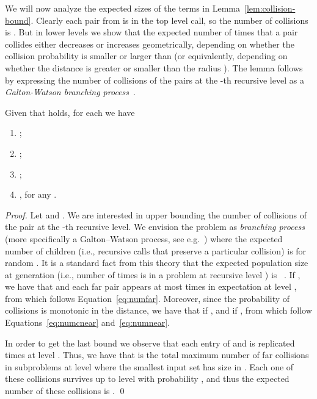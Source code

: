 \documentclass{llncs}
\begin{document}
We will now analyze the expected sizes of the terms in Lemma~\ref{lem:collision-bound}. 
Clearly each pair from  is in the top level call, so the number of collisions is . 
But in lower levels we show that the expected number of times that a pair collides either decreases or increases geometrically, depending on whether the collision probability is smaller or larger than  (or equivalently, depending on whether the distance is greater or smaller than the radius ). 
The lemma follows by expressing the number of collisions of the pairs at the -th recursive level as a \emph{Galton-Watson branching process}~\cite{harris2002theory}. 


\begin{lemma}\label{lemma:expectation}
Given that  holds, for each  we have

\begin{enumerate}
	\item \label{eq:numfar};
	\item  \label{eq:numcnear};
	\item \label{eq:numnear};
	\item , for any \label{eq:numfarK}.
\end{enumerate}
\end{lemma}

\begin{proof}

Let  and . 
We are interested in upper bounding the number of collisions of the pair at the -th recursive level. 
We envision the problem as \emph{branching process} (more specifically a Galton–Watson process, see e.g.~\cite{harris2002theory}) where the expected number of children (i.e., recursive calls that preserve a particular collision) is  for random . 
It is a standard fact from this theory that the expected population size at generation  (i.e., number of times  is in a problem at recursive level ) is ~\cite[Theorem 5.1]{harris2002theory}. 
If , we have that  and each far pair appears at most  times in expectation at level , from which follows Equation~\ref{eq:numfar}. 
Moreover, since the probability of collisions is monotonic in the distance, we have that   if , and  if , from which follow Equations~\ref{eq:numcnear} and~\ref{eq:numnear}.

In order to get the last bound we observe that each entry of  and  is replicated  times at level . 
Thus, we have that  is the total maximum number of far collisions in subproblems at level  where the smallest input set has size in . 
Each one of these collisions survives up to level  with probability , and thus the expected number of these collisions is . \qed

\end{proof}
\end{document}
